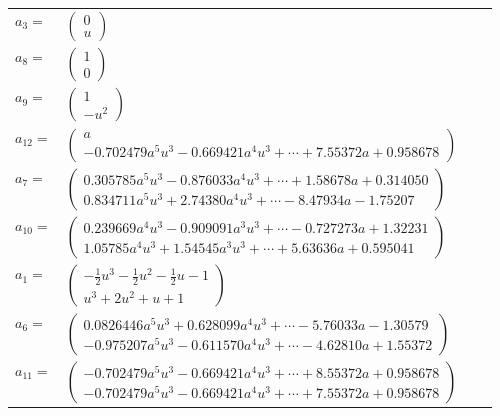 \documentclass[1p]{elsarticle_modified}
\theoremstyle{definition}
\begin{document}
\begin{tabular}{m{7pt} m{180pt} m{7pt} m{180pt} }
\flushright $a_{3}=$&$\begin{pmatrix}0\\u\end{pmatrix}$ \\
\flushright $a_{8}=$&$\begin{pmatrix}1\\0\end{pmatrix}$ \\
\flushright $a_{9}=$&$\begin{pmatrix}1\\- u^2\end{pmatrix}$ \\
\flushright $a_{12}=$&$\begin{pmatrix}a\\-0.702479 a^{5} u^{3}-0.669421 a^{4} u^{3}+\cdots+7.55372 a+0.958678\end{pmatrix}$ \\
\flushright $a_{7}=$&$\begin{pmatrix}0.305785 a^{5} u^{3}-0.876033 a^{4} u^{3}+\cdots+1.58678 a+0.314050\\0.834711 a^{5} u^{3}+2.74380 a^{4} u^{3}+\cdots-8.47934 a-1.75207\end{pmatrix}$ \\
\flushright $a_{10}=$&$\begin{pmatrix}0.239669 a^{4} u^{3}-0.909091 a^{3} u^{3}+\cdots-0.727273 a+1.32231\\1.05785 a^{4} u^{3}+1.54545 a^{3} u^{3}+\cdots+5.63636 a+0.595041\end{pmatrix}$ \\
\flushright $a_{1}=$&$\begin{pmatrix}-\frac{1}{2} u^3-\frac{1}{2} u^2-\frac{1}{2} u-1\\u^3+2 u^2+u+1\end{pmatrix}$ \\
\flushright $a_{6}=$&$\begin{pmatrix}0.0826446 a^{5} u^{3}+0.628099 a^{4} u^{3}+\cdots-5.76033 a-1.30579\\-0.975207 a^{5} u^{3}-0.611570 a^{4} u^{3}+\cdots-4.62810 a+1.55372\end{pmatrix}$ \\
\flushright $a_{11}=$&$\begin{pmatrix}-0.702479 a^{5} u^{3}-0.669421 a^{4} u^{3}+\cdots+8.55372 a+0.958678\\-0.702479 a^{5} u^{3}-0.669421 a^{4} u^{3}+\cdots+7.55372 a+0.958678\end{pmatrix}$ \\

\end{tabular}
\end{document}
